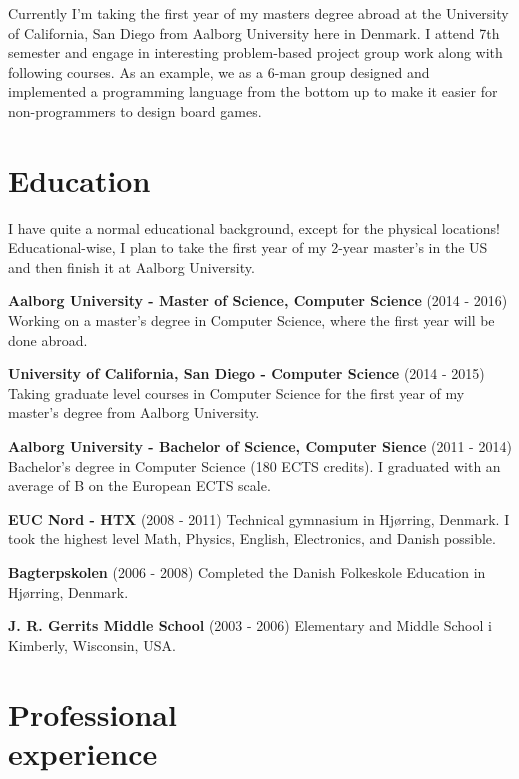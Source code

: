 \documentclass[margin,line,a4paper]{resume}
\begin{document}
\begin{resume}
    Currently I'm taking the first year of my masters degree abroad at
    the University of California, San Diego from Aalborg University
    here in Denmark. I attend 7th semester and engage in interesting
    problem-based project group work along with following courses.
    As an example, we as a 6-man group designed and implemented a
    programming language from the bottom up to make it easier for
    non-programmers to design board games. 

    \section{\mysidestyle Education}
    I have quite a normal educational background, except for the
    physical locations! Educational-wise, I plan to take the first year of
    my 2-year master's in the US and then finish it at Aalborg University.

    \textbf{Aalborg University - Master of Science, Computer Science}
    (2014 - 2016) Working on a master's degree in Computer
    Science, where the first year will be done abroad.

    \textbf{University of California, San Diego - Computer Science}
    (2014 - 2015) Taking graduate level courses in Computer Science for the
    first year of my master's degree from Aalborg University.

    \textbf{Aalborg University - Bachelor of Science, Computer Sience}
    (2011 - 2014) Bachelor's degree in Computer Science (180 ECTS
    credits). I graduated with an average of B on the European ECTS
    scale.      

    \textbf{EUC Nord - HTX} (2008 - 2011) Technical gymnasium in
    Hjørring, Denmark. I took the highest level Math, Physics, English,
    Electronics, and Danish possible.
    
    \textbf{Bagterpskolen} (2006 - 2008) Completed the Danish
    Folkeskole Education in Hjørring, Denmark.

    \textbf{J. R. Gerrits Middle School} (2003 - 2006) Elementary and 
    Middle School i Kimberly, Wisconsin, USA.

\section{\mysidestyle Professional\\experience}\vspace{1mm}
\begin{description}


\end{description}
\end{resume}
\end{document}

